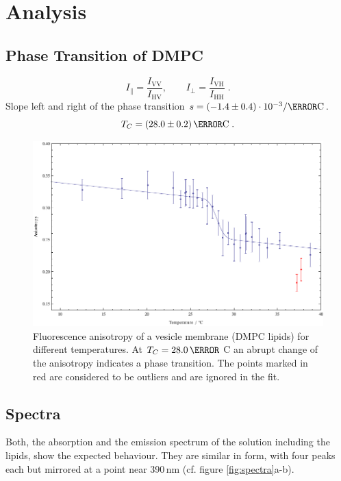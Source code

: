 \documentclass{scrartcl}
\numberwithin{equation}{section}
\numberwithin{figure}{section}
\numberwithin{table}{section}
\newcommand{\eq}[2]{\begin{equation}#1\label{#2}\end{equation}}
\begin{document}
\clearpage

\section{Analysis}

\subsection{Phase Transition of DMPC}

\eq{I_\parallel = \frac{I_\text{VV}}{I_\text{HV}} , \qquad I_\perp = \frac{I_\text{VH}}{I_\text{HH}} \; . }{idef}
Slope left and right of the phase transition $s = (-1.4 \pm 0.4 ) \cdot 10^{-3} / \degree \text{C}$.
\eq{ T_C = ( 28.0 \pm 0.2 ) \, \degree \text{C} \; .}{Tc}

\begin{figure}
\centering
\includegraphics[width=\linewidth]{img/phasetransition.pdf}
\caption{ \small Fluorescence anisotropy of a vesicle membrane (DMPC lipids) for different temperatures. At $T_C=28.0 \, \degree$ C an abrupt change of the anisotropy indicates a phase transition. The points marked in red are considered to be outliers and are ignored in the fit.}
\label{fig:phase}
\end{figure}



\subsection{Spectra}
Both, the absorption and the emission spectrum of the solution including the lipids, show the expected behaviour. They are similar in form, with four peaks each but mirrored at a point near 390\,nm (cf. figure \ref{fig:spectra}a-b).
\end{document}
